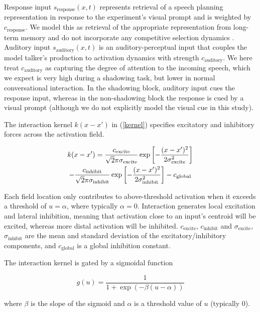 \documentclass[10pt,letterpaper]{article}
\begin{document}
Response input $s_{\text{response}}(x,t)$ represents retrieval of a speech planning representation in response to the experiment's visual prompt and is weighted by $c_{\text{response}}$. We model this as retrieval of the appropriate representation from long-term memory \citep{roon-gafos2016} and do not incorporate any competitive selection dynamics \citep[e.g.][]{tilsen2019}. Auditory input $s_{\text{auditory}}(x,t)$ is an auditory-perceptual input that couples the model talker's production to activation dynamics with strength $c_{\text{auditory}}$. We here treat $c_{\text{auditory}}$ as capturing the degree of attention to the incoming speech, which we expect is very high during a shadowing task, but lower in normal conversational interaction. In the shadowing block, auditory input cues the response input, whereas in the non-shadowing block the response is cued by a visual prompt (although we do not explicitly model the visual cue in this study).

The interaction kernel $k(x - x')$ in (\ref{kernel}) specifies excitatory and inhibitory forces across the activation field.

\begin{multline}
k(x - x') = \frac{c_{\text{excite}}}{\sqrt 2 \pi \sigma_{\text{excite}}} \exp \left[ -\frac{(x-x')^2}{2 \sigma^2_{\text{\text{excite}}}} \right]
\\
- \frac{c_{\text{inhibit}}}{\sqrt 2 \pi \sigma_{\text{inhibit}}} \exp \left[ -\frac{(x-x')^2}{2 \sigma^2_{\text{inhibit}}} \right] - c_{\text{global}}
\label{kernel}
\end{multline}

 Each field location only contributes to above-threshold activation when it exceeds a threshold of $u = \alpha$, where typically $\alpha = 0$. Interaction generates local excitation and lateral inhibition, meaning that activation close to an input's centroid will be excited, whereas more distal activation will be inhibited. $c_{\text{excite}}$, $c_{\text{inhibit}}$ and $\sigma_{\text{excite}}$, $\sigma_{\text{inhibit}}$ are the mean and standard deviation of the excitatory/inhibitory components, and $c_{\text{global}}$ is a global inhibition constant.

The interaction kernel is gated by a sigmoidal function

\begin{equation}
g(u) = \frac{1}{1+\exp (-\beta (u-\alpha))}
\label{dnf_sigmoid}
\end{equation}

where $\beta$ is the slope of the sigmoid and $\alpha$ is a threshold value of $u$ (typically 0).
\end{document}
